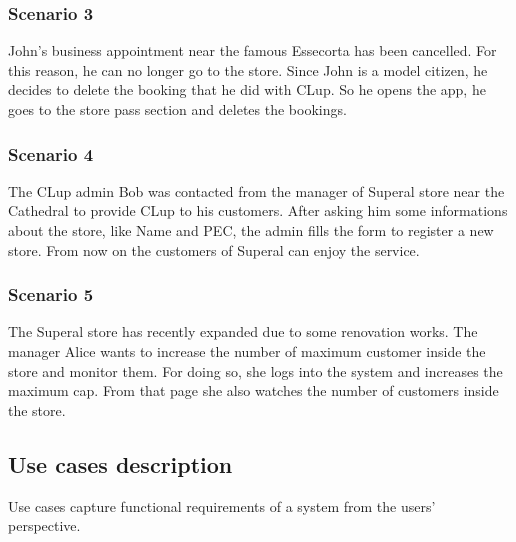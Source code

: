 \subsubsection{Scenario 3}\label{sc:third}
John's business appointment near the famous Essecorta has been cancelled. For this reason, he can no longer go to the store.\newline
Since John is a model citizen, he decides to delete the booking that he did with CLup. So he opens the app, he goes to the store pass section and deletes the bookings.
\subsubsection{Scenario 4}\label{sc:fourth}
The CLup admin Bob was contacted from the manager of Superal store near the Cathedral to provide CLup to his customers. After asking him some informations about the store, like Name and PEC, the admin fills the form to register a new store. From now on the customers of Superal can enjoy the service.
\subsubsection{Scenario 5}\label{sc:fifth}
The Superal store has recently expanded due to some renovation works. The manager Alice wants to increase the number of maximum customer inside the store and monitor them.\newline
For doing so, she logs into the system and increases the maximum cap. From that page she also watches the number of customers inside the store.

\clearpage
\subsection{Use cases description}
Use cases capture functional requirements of a system from the users' perspective.

